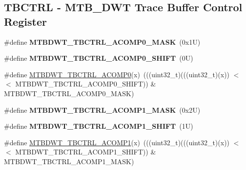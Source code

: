 \subsection*{T\+B\+C\+T\+RL -\/ M\+T\+B\+\_\+\+D\+WT Trace Buffer Control Register}
\begin{DoxyCompactItemize}
\item 
\mbox{\label{group___m_t_b_d_w_t___register___masks_ga6700f71254985be76d08c98be405c876}} 
\#define {\bfseries M\+T\+B\+D\+W\+T\+\_\+\+T\+B\+C\+T\+R\+L\+\_\+\+A\+C\+O\+M\+P0\+\_\+\+M\+A\+SK}~(0x1\+U)
\item 
\mbox{\label{group___m_t_b_d_w_t___register___masks_ga3f297c6f29c0139f278543f70bb136a5}} 
\#define {\bfseries M\+T\+B\+D\+W\+T\+\_\+\+T\+B\+C\+T\+R\+L\+\_\+\+A\+C\+O\+M\+P0\+\_\+\+S\+H\+I\+FT}~(0\+U)
\item 
\#define \mbox{\hyperlink{group___m_t_b_d_w_t___register___masks_ga855d2d7f528e0eb37dbbd52da4515d8e}{M\+T\+B\+D\+W\+T\+\_\+\+T\+B\+C\+T\+R\+L\+\_\+\+A\+C\+O\+M\+P0}}(x)~(((uint32\+\_\+t)(((uint32\+\_\+t)(x)) $<$$<$ M\+T\+B\+D\+W\+T\+\_\+\+T\+B\+C\+T\+R\+L\+\_\+\+A\+C\+O\+M\+P0\+\_\+\+S\+H\+I\+FT)) \& M\+T\+B\+D\+W\+T\+\_\+\+T\+B\+C\+T\+R\+L\+\_\+\+A\+C\+O\+M\+P0\+\_\+\+M\+A\+SK)
\item 
\mbox{\label{group___m_t_b_d_w_t___register___masks_ga705f0b194cf2368d788195be4572665f}} 
\#define {\bfseries M\+T\+B\+D\+W\+T\+\_\+\+T\+B\+C\+T\+R\+L\+\_\+\+A\+C\+O\+M\+P1\+\_\+\+M\+A\+SK}~(0x2\+U)
\item 
\mbox{\label{group___m_t_b_d_w_t___register___masks_gafadbf74633562a3f35979a381188ed38}} 
\#define {\bfseries M\+T\+B\+D\+W\+T\+\_\+\+T\+B\+C\+T\+R\+L\+\_\+\+A\+C\+O\+M\+P1\+\_\+\+S\+H\+I\+FT}~(1\+U)
\item 
\#define \mbox{\hyperlink{group___m_t_b_d_w_t___register___masks_gaf75a97916d12741cc52c97895015979f}{M\+T\+B\+D\+W\+T\+\_\+\+T\+B\+C\+T\+R\+L\+\_\+\+A\+C\+O\+M\+P1}}(x)~(((uint32\+\_\+t)(((uint32\+\_\+t)(x)) $<$$<$ M\+T\+B\+D\+W\+T\+\_\+\+T\+B\+C\+T\+R\+L\+\_\+\+A\+C\+O\+M\+P1\+\_\+\+S\+H\+I\+FT)) \& M\+T\+B\+D\+W\+T\+\_\+\+T\+B\+C\+T\+R\+L\+\_\+\+A\+C\+O\+M\+P1\+\_\+\+M\+A\+SK)
\item 
\mbox{\label{group___m_t_b_d_w_t___register___masks_ga15e57c95e23eee0df8332b48e65b9ef7}} 

\end{DoxyCompactItemize}
